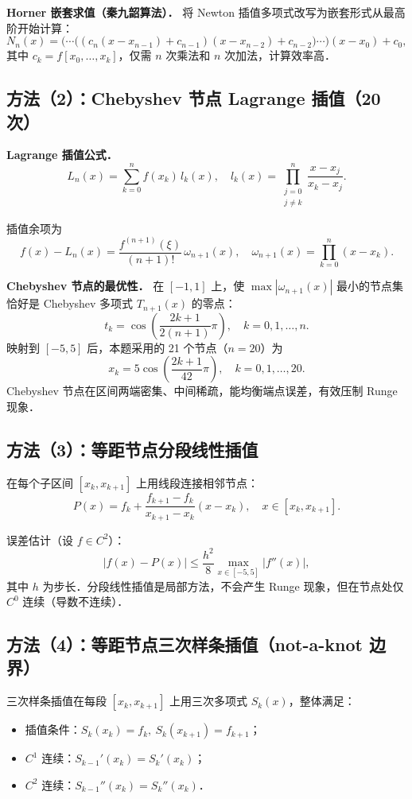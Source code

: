 \documentclass[UTF8,a4paper,11pt]{article}
\begin{document}
\noindent\textbf{Horner 嵌套求值（秦九韶算法）．}
将 Newton 插值多项式改写为嵌套形式从最高阶开始计算：
$$N_n(x) = \bigl(\cdots\bigl((c_n(x-x_{n-1}) + c_{n-1})(x-x_{n-2}) + c_{n-2}\bigr)\cdots\bigr)(x-x_0) + c_0,$$
其中 $c_k = f[x_0,\ldots,x_k]$，仅需 $n$ 次乘法和 $n$ 次加法，计算效率高．

\subsection{方法（2）：Chebyshev 节点 Lagrange 插值（20 次）}

\noindent\textbf{Lagrange 插值公式．}
$$L_n(x) = \sum_{k=0}^{n} f(x_k)\,l_k(x), \quad l_k(x) = \prod_{\substack{j=0\\j\ne k}}^{n} \frac{x - x_j}{x_k - x_j}.$$

插值余项为
$$f(x) - L_n(x) = \frac{f^{(n+1)}(\xi)}{(n+1)!}\,\omega_{n+1}(x), \quad \omega_{n+1}(x) = \prod_{k=0}^{n}(x-x_k).$$

\noindent\textbf{Chebyshev 节点的最优性．}
在 $[-1,1]$ 上，使 $\max|\omega_{n+1}(x)|$ 最小的节点集恰好是 Chebyshev 多项式 $T_{n+1}(x)$ 的零点：
$$t_k = \cos\!\left(\frac{2k+1}{2(n+1)}\pi\right), \quad k=0,1,\ldots,n.$$
映射到 $[-5,5]$ 后，本题采用的 21 个节点（$n=20$）为
$$x_k = 5\cos\!\left(\frac{2k+1}{42}\pi\right), \quad k=0,1,\ldots,20.$$
Chebyshev 节点在区间两端密集、中间稀疏，能均衡端点误差，有效压制 Runge 现象．

\subsection{方法（3）：等距节点分段线性插值}

在每个子区间 $[x_k,x_{k+1}]$ 上用线段连接相邻节点：
$$P(x) = f_k + \frac{f_{k+1}-f_k}{x_{k+1}-x_k}(x-x_k), \quad x\in[x_k,x_{k+1}].$$

误差估计（设 $f\in C^2$）：
$$|f(x)-P(x)| \le \frac{h^2}{8}\max_{x\in[-5,5]}|f''(x)|,$$
其中 $h$ 为步长．分段线性插值是局部方法，不会产生 Runge 现象，但在节点处仅 $C^0$ 连续（导数不连续）．

\subsection{方法（4）：等距节点三次样条插值（not-a-knot 边界）}

三次样条插值在每段 $[x_k,x_{k+1}]$ 上用三次多项式 $S_k(x)$，整体满足：
\begin{itemize}
  \item 插值条件：$S_k(x_k)=f_k,\ S_k(x_{k+1})=f_{k+1}$；
  \item $C^1$ 连续：$S_{k-1}'(x_k) = S_k'(x_k)$；
  \item $C^2$ 连续：$S_{k-1}''(x_k) = S_k''(x_k)$．
\end{itemize}
\end{document}
